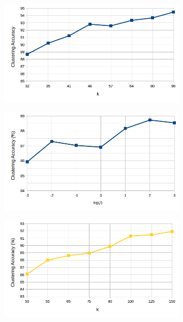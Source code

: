   \begin{figure}[!h]
  \centering
  \begin{subfigure}[b]{0.43\linewidth}
    \includegraphics[width=\linewidth]{images/cluster_k_apy}
  \end{subfigure}
%
  \begin{subfigure}[b]{0.43\linewidth}
    \includegraphics[width=\linewidth]{images/cluster_beta_apy}
  \end{subfigure}
    \begin{subfigure}[b]{0.43\linewidth}
    \includegraphics[width=\linewidth]{images/cluster_k}

\end{subfigure}
\end{figure}
